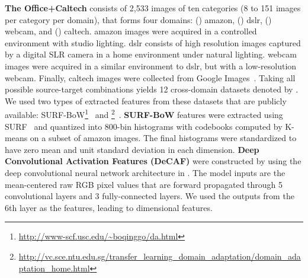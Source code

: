 \documentclass[10pt,journal,compsoc]{IEEEtran}
\begin{document}
\textbf{The Office+Caltech}
consists of 2,533 images of ten categories (8 to 151 images per category per domain), that forms four domains:
() {\sc amazon}, () {\sc dslr}, () {\sc webcam}, and () {\sc caltech}.
{\sc amazon} images were acquired in a controlled environment with studio lighting.
{\sc dslr} consists of high resolution images captured by a digital SLR camera in a home environment under natural lighting.
{\sc webcam} images were acquired in a similar environment to {\sc dslr}, but with a low-resolution webcam.
Finally, {\sc caltech} images were collected from Google Images~\cite{Griffin2007}.
Taking all possible source-target combinations yields 12 cross-domain datasets denoted by 
.
We used two types of extracted features from these datasets that are publicly available: SURF-BoW\footnote{\url{http://www-scf.usc.edu/~boqinggo/da.html}}~\cite{Saenko:2010aa} and \footnote{\url{http://vc.sce.ntu.edu.sg/transfer_learning_domain_adaptation/domain_adaptation_home.html}}~\cite{Donahue:2014aa}.
\textbf{SURF-BoW} features were extracted using SURF~\cite{Bay:2008aa} and quantized into 800-bin histograms with codebooks computed by K-means on a subset of {\sc amazon} images.
The final histograms were standardized to have zero mean and unit standard deviation in each dimension.
\textbf{Deep Convolutional Activation Features (DeCAF)}
were constructed by \cite{Donahue:2014aa} using the deep convolutional neural network architecture in \cite{Krizhevsky:2012aa}.
The model inputs are the mean-centered raw RGB pixel values that are forward propagated through 5 convolutional layers and 3 fully-connected layers.
We used the outputs from the 6th layer as the features, leading to  dimensional  features.
\end{document}
